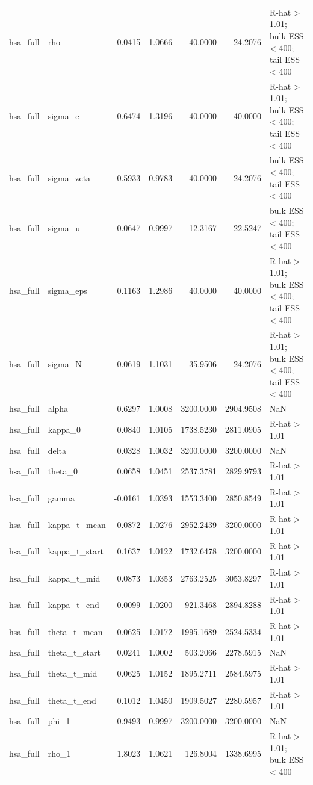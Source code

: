 \begin{tabular}{llrrrrl}
hsa\_full & rho & 0.0415 & 1.0666 & 40.0000 & 24.2076 & R-hat > 1.01; bulk ESS < 400; tail ESS < 400 \\
hsa\_full & sigma\_e & 0.6474 & 1.3196 & 40.0000 & 40.0000 & R-hat > 1.01; bulk ESS < 400; tail ESS < 400 \\
hsa\_full & sigma\_zeta & 0.5933 & 0.9783 & 40.0000 & 24.2076 & bulk ESS < 400; tail ESS < 400 \\
hsa\_full & sigma\_u & 0.0647 & 0.9997 & 12.3167 & 22.5247 & bulk ESS < 400; tail ESS < 400 \\
hsa\_full & sigma\_eps & 0.1163 & 1.2986 & 40.0000 & 40.0000 & R-hat > 1.01; bulk ESS < 400; tail ESS < 400 \\
hsa\_full & sigma\_N & 0.0619 & 1.1031 & 35.9506 & 24.2076 & R-hat > 1.01; bulk ESS < 400; tail ESS < 400 \\
hsa\_full & alpha & 0.6297 & 1.0008 & 3200.0000 & 2904.9508 & NaN \\
hsa\_full & kappa\_0 & 0.0840 & 1.0105 & 1738.5230 & 2811.0905 & R-hat > 1.01 \\
hsa\_full & delta & 0.0328 & 1.0032 & 3200.0000 & 3200.0000 & NaN \\
hsa\_full & theta\_0 & 0.0658 & 1.0451 & 2537.3781 & 2829.9793 & R-hat > 1.01 \\
hsa\_full & gamma & -0.0161 & 1.0393 & 1553.3400 & 2850.8549 & R-hat > 1.01 \\
hsa\_full & kappa\_t\_mean & 0.0872 & 1.0276 & 2952.2439 & 3200.0000 & R-hat > 1.01 \\
hsa\_full & kappa\_t\_start & 0.1637 & 1.0122 & 1732.6478 & 3200.0000 & R-hat > 1.01 \\
hsa\_full & kappa\_t\_mid & 0.0873 & 1.0353 & 2763.2525 & 3053.8297 & R-hat > 1.01 \\
hsa\_full & kappa\_t\_end & 0.0099 & 1.0200 & 921.3468 & 2894.8288 & R-hat > 1.01 \\
hsa\_full & theta\_t\_mean & 0.0625 & 1.0172 & 1995.1689 & 2524.5334 & R-hat > 1.01 \\
hsa\_full & theta\_t\_start & 0.0241 & 1.0002 & 503.2066 & 2278.5915 & NaN \\
hsa\_full & theta\_t\_mid & 0.0625 & 1.0152 & 1895.2711 & 2584.5975 & R-hat > 1.01 \\
hsa\_full & theta\_t\_end & 0.1012 & 1.0450 & 1909.5027 & 2280.5957 & R-hat > 1.01 \\
hsa\_full & phi\_1 & 0.9493 & 0.9997 & 3200.0000 & 3200.0000 & NaN \\
hsa\_full & rho\_1 & 1.8023 & 1.0621 & 126.8004 & 1338.6995 & R-hat > 1.01; bulk ESS < 400 \\

\end{tabular}
